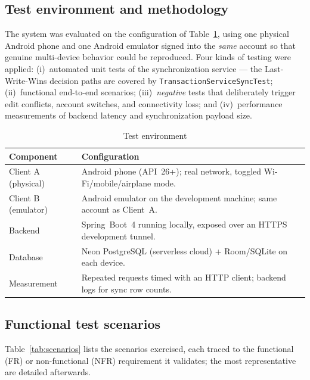 \documentclass[13pt,a4paper]{extarticle}
\begin{document}
\subsection{Test environment and methodology}
The system was evaluated on the configuration of Table~\ref{tab:testenv}, using one physical Android
phone and one Android emulator signed into the \emph{same} account so that genuine multi-device
behavior could be reproduced. Four kinds of testing were applied: (i)~automated unit tests of the
synchronization service --- the Last-Write-Wins decision paths are covered by
\texttt{TransactionServiceSyncTest}; (ii)~functional end-to-end scenarios; (iii)~\emph{negative}
tests that deliberately trigger edit conflicts, account switches, and connectivity loss; and
(iv)~performance measurements of backend latency and synchronization payload size.

\begin{table}[H]
\centering
\caption{Test environment}
\label{tab:testenv}
\renewcommand{\arraystretch}{1.2}
\begin{tabularx}{\textwidth}{@{}l X@{}}
\toprule
\textbf{Component} & \textbf{Configuration} \\
\midrule
Client A (physical) & Android phone (API~26+); real network, toggled Wi-Fi/mobile/airplane mode. \\
Client B (emulator) & Android emulator on the development machine; same account as Client~A. \\
Backend             & Spring~Boot~4 running locally, exposed over an HTTPS development tunnel. \\
Database            & Neon PostgreSQL (serverless cloud) + Room/SQLite on each device. \\
Measurement         & Repeated requests timed with an HTTP client; backend logs for sync row counts. \\
\bottomrule
\end{tabularx}
\end{table}

\subsection{Functional test scenarios}
Table~\ref{tab:scenarios} lists the scenarios exercised, each traced to the functional (FR) or
non-functional (NFR) requirement it validates; the most representative are detailed afterwards.
\end{document}
